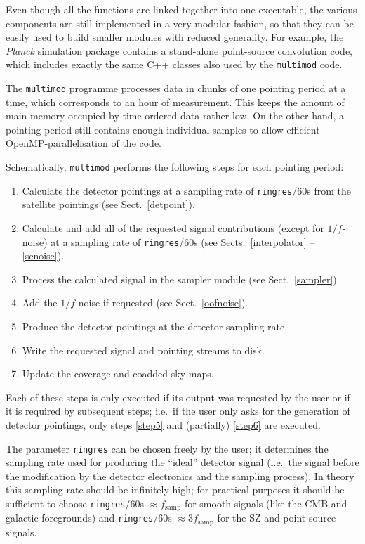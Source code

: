 \documentclass{aa}
\begin{document}
Even though all the functions are linked together into one
executable, the various components are still implemented in a very
modular fashion, so that they can be easily used to build smaller modules with
reduced generality. For example, the \emph{Planck} simulation package
contains a stand-alone point-source convolution code, which includes
exactly the same C++ classes also used by the {\tt multimod} code.

The {\tt multimod} programme processes data in chunks of one pointing
period at a time, which corresponds to an hour of measurement. This keeps
the amount of main memory occupied by time-ordered data rather low. On
the other hand, a pointing period still contains enough individual
samples to allow efficient OpenMP-parallelisation of the code.

Schematically, {\tt multimod} performs the following steps for each pointing
period:
\begin{enumerate}
\item Calculate the detector pointings at a sampling rate of {\tt ringres}/60s
  from the satellite pointings (see Sect.~\ref{detpoint}).
\item Calculate and add all of the requested signal contributions
  (except for $1/f$-noise) at a sampling rate of {\tt ringres}/60s
  (see Sects.~\ref{interpolator} -- \ref{scnoise}).
\item Process the calculated signal in the sampler module
  (see Sect.~\ref{sampler}).
\item Add the $1/f$-noise if requested (see Sect.~\ref{oofnoise}).
\item Produce the detector pointings at the detector sampling rate.
  \label{step5}
\item Write the requested signal and pointing streams to disk. \label{step6}
\item Update the coverage and coadded sky maps.
\end{enumerate}
Each of these steps is only executed if its output was requested by the user
or if it is required by subsequent steps; i.e.\ if the user only asks for
the generation of detector pointings, only steps \ref{step5}  and
(partially) \ref{step6} are executed.

The parameter {\tt ringres} can be chosen freely by the user; it determines
the sampling rate used for producing the ``ideal'' detector signal
(i.e.\ the signal before the modification by the detector electronics and
the sampling process). In theory this sampling rate should be infinitely
high; for practical purposes it should be sufficient to choose
{\tt ringres}/60s $\approx\! f_{\text{samp}}$ for smooth signals (like the CMB
and galactic foregrounds) and {\tt ringres}/60s $\approx\! 3f_{\text{samp}}$
for the SZ and point-source signals.
\end{document}
